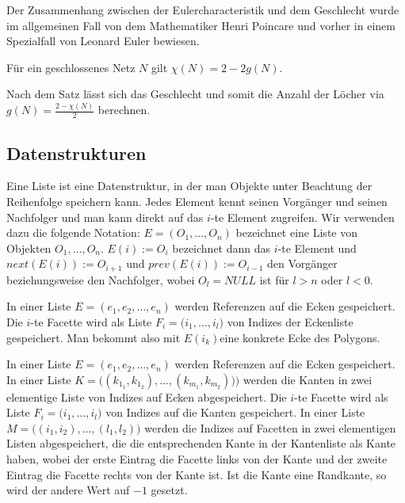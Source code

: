 Der Zusammenhang zwischen der Eulercharacteristik und dem Geschlecht wurde im allgemeinen Fall von dem Mathematiker  
Henri Poincare und vorher in einem Spezialfall von Leonard Euler bewiesen. 
\begin{Satz}
Für ein geschlossenes Netz $N$ gilt $\chi(N) = 2 - 2g(N)$. 
\end{Satz}

\begin{Bemerkung}
Nach dem Satz lässt sich das Geschlecht und somit die Anzahl der Löcher via $g(N) = \frac{2- \chi(N)}{2}$ berechnen.
\end{Bemerkung}

\subsection{Datenstrukturen}
\begin{Definition}
Eine Liste ist eine Datenstruktur, in der man Objekte unter Beachtung der Reihenfolge  speichern kann. Jedes Element kennt seinen Vorgänger und seinen Nachfolger und man kann direkt auf das
 $i$-te Element zugreifen. Wir verwenden dazu die folgende Notation:  $E = (O_1, \hdots ,O_n )$ bezeichnet eine Liste von Objekten $O_1, \hdots, O_n$.
$E(i):= O_i$ bezeichnet dann das $i$-te Element und $next(E(i)) := O_{i+1}$ und $prev(E(i)):= O_{i-1}$ den Vorgänger beziehungsweise den Nachfolger, 
wobei $O_{l} = NULL$ ist für $l >n$ oder $l < 0$.

\end{Definition}

\begin{Definition}[Eckenliste]
In einer Liste $E = (e_1, e_2, \hdots, e_n)$ werden Referenzen auf die Ecken gespeichert. Die $i$-te Facette wird als Liste $F_i = \bigl(i_1, \hdots , i_l  \bigr)$  von Indizes der Eckenliste gespeichert. Man bekommt also mit $E(i_k)$eine konkrete Ecke des Polygons. 
\end{Definition}

\begin{Definition}[Kantenliste]
In einer Liste $E = (e_1, e_2, \hdots, e_n)$ werden Referenzen auf die Ecken gespeichert. In einer Liste $K=\bigl(   (k_{1_1}, k_{1_2}), \hdots,  (k_{m_1} , k_{m_2})    ) \bigr)$ werden die Kanten in zwei elementige Liste von Indizes auf Ecken abgespeichert. Die $i$-te Facette wird als Liste $F_i = \bigl( i_1, \hdots , i_l  \bigr)$  von Indizes auf die Kanten  gespeichert. In einer Liste
$M=  \bigl(    (i_1, i_2), \hdots  ,(l_1, l_2 )   \bigr )$ werden die Indizes auf Facetten in zwei elementigen Listen abgespeichert, die die entsprechenden Kante in der Kantenliste als Kante haben,
 wobei der erste Eintrag die Facette links von der Kante und der zweite Eintrag die Facette rechts von der Kante ist. 
Ist die Kante eine Randkante, so wird der andere Wert  auf  $-1$ gesetzt.
 
\end{Definition}

